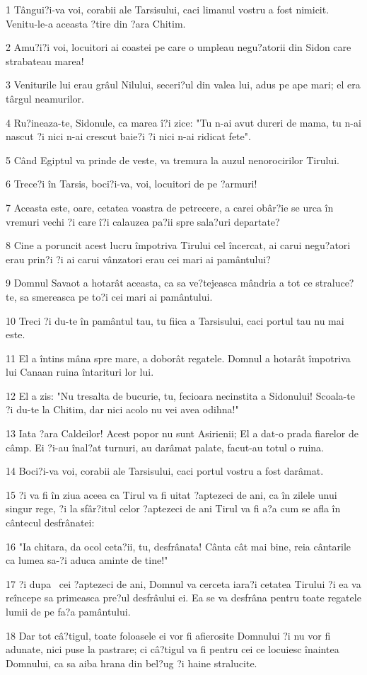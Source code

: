 \par 1 Tângui?i-va voi, corabii ale Tarsisului, caci limanul vostru a fost nimicit. Venitu-le-a aceasta ?tire din ?ara Chitim.
\par 2 Amu?i?i voi, locuitori ai coastei pe care o umpleau negu?atorii din Sidon care strabateau marea!
\par 3 Veniturile lui erau grâul Nilului, seceri?ul din valea lui, adus pe ape mari; el era târgul neamurilor.
\par 4 Ru?ineaza-te, Sidonule, ca marea î?i zice: "Tu n-ai avut dureri de mama, tu n-ai nascut ?i nici n-ai crescut baie?i ?i nici n-ai ridicat fete".
\par 5 Când Egiptul va prinde de veste, va tremura la auzul nenorocirilor Tirului.
\par 6 Trece?i în Tarsis, boci?i-va, voi, locuitori de pe ?armuri!
\par 7 Aceasta este, oare, cetatea voastra de petrecere, a carei obâr?ie se urca în vremuri vechi ?i care î?i calauzea pa?ii spre sala?uri departate?
\par 8 Cine a poruncit acest lucru împotriva Tirului cel încercat, ai carui negu?atori erau prin?i ?i ai carui vânzatori erau cei mari ai pamântului?
\par 9 Domnul Savaot a hotarât aceasta, ca sa ve?tejeasca mândria a tot ce straluce?te, sa smereasca pe to?i cei mari ai pamântului.
\par 10 Treci ?i du-te în pamântul tau, tu fiica a Tarsisului, caci portul tau nu mai este.
\par 11 El a întins mâna spre mare, a doborât regatele. Domnul a hotarât împotriva lui Canaan ruina întarituri lor lui.
\par 12 El a zis: "Nu tresalta de bucurie, tu, fecioara necinstita a Sidonului! Scoala-te ?i du-te la Chitim, dar nici acolo nu vei avea odihna!"
\par 13 Iata ?ara Caldeilor! Acest popor nu sunt Asirienii; El a dat-o prada fiarelor de câmp. Ei ?i-au înal?at turnuri, au darâmat palate, facut-au totul o ruina.
\par 14 Boci?i-va voi, corabii ale Tarsisului, caci portul vostru a fost darâmat.
\par 15 ?i va fi în ziua aceea ca Tirul va fi uitat ?aptezeci de ani, ca în zilele unui singur rege, ?i la sfâr?itul celor ?aptezeci de ani Tirul va fi a?a cum se afla în cântecul desfrânatei:
\par 16 "Ia chitara, da ocol ceta?ii, tu, desfrânata! Cânta cât mai bine, reia cântarile ca lumea sa-?i aduca aminte de tine!"
\par 17 ?i dupa  cei ?aptezeci de ani, Domnul va cerceta iara?i cetatea Tirului ?i ea va reîncepe sa primeasca pre?ul desfrâului ei. Ea se va desfrâna pentru toate regatele lumii de pe fa?a pamântului.
\par 18 Dar tot câ?tigul, toate foloasele ei vor fi afierosite Domnului ?i nu vor fi adunate, nici puse la pastrare; ci câ?tigul va fi pentru cei ce locuiesc înaintea Domnului, ca sa aiba hrana din bel?ug ?i haine stralucite.

